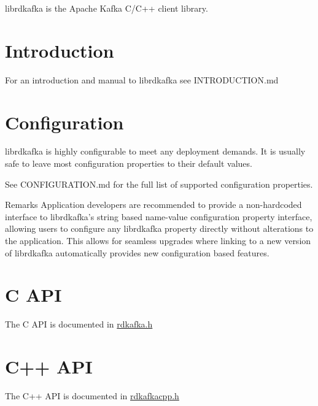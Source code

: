 librdkafka is the Apache Kafka C/C++ client library.\hypertarget{main_intro}{}\section{Introduction}\label{main_intro}
For an introduction and manual to librdkafka see INTRODUCTION.md\hypertarget{main_conf}{}\section{Configuration}\label{main_conf}
librdkafka is highly configurable to meet any deployment demands. It is usually safe to leave most configuration properties to their default values.

See CONFIGURATION.md for the full list of supported configuration properties.

\begin{DoxyRemark}{Remarks}
Application developers are recommended to provide a non-\/hardcoded interface to librdkafka's string based name-\/value configuration property interface, allowing users to configure any librdkafka property directly without alterations to the application. This allows for seamless upgrades where linking to a new version of librdkafka automatically provides new configuration based features.
\end{DoxyRemark}
\hypertarget{main_c_api}{}\section{C API}\label{main_c_api}
The C API is documented in \hyperlink{rdkafka_8h}{rdkafka.h}\hypertarget{main_cpp_api}{}\section{C++ API}\label{main_cpp_api}
The C++ API is documented in \hyperlink{rdkafkacpp_8h}{rdkafkacpp.h} 